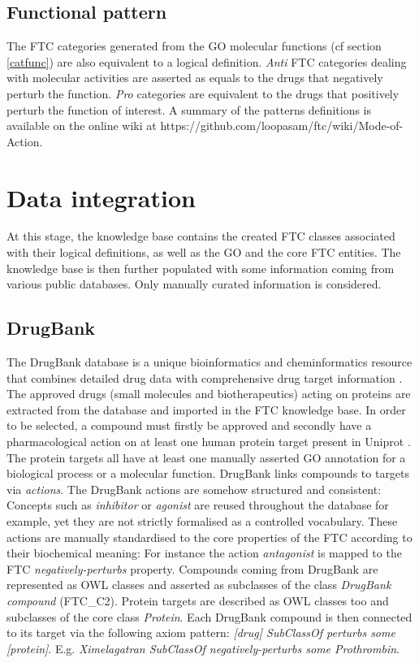 \documentclass{bioinfo}
\begin{document}
\subsection{Functional pattern}
The FTC categories generated from the GO molecular functions (cf section \ref{catfunc}) are also equivalent to a logical 
definition. \emph{Anti} FTC categories dealing with molecular activities are asserted as equals to the drugs 
that negatively perturb the function. \emph{Pro} categories are equivalent to the drugs that positively perturb the 
function of interest. A summary of the patterns definitions is available on the 
online wiki at {{https://github.com/loopasam/ftc/wiki/Mode-of-Action}}.

\section{Data integration}
At this stage, the knowledge base contains the created FTC classes associated with their 
logical definitions, as well as the GO and the core FTC entities. The knowledge base is then 
further populated with some information coming from various public databases. Only manually curated 
information is considered.

\subsection{DrugBank}
The DrugBank database is a unique bioinformatics and cheminformatics resource 
that combines detailed drug data with comprehensive drug target information \citep{Knox2011}. The approved 
drugs (small molecules and biotherapeutics) acting on proteins are extracted from the database and 
imported in the FTC knowledge base. In order to be selected, a compound must firstly be approved and 
secondly have a pharmacological action on at least one human protein target present in Uniprot \citep{TheUniprotConsortium2013}. 
The protein targets all have at least one manually asserted GO annotation \citep{Dimmer2012} for a biological process or a 
molecular function. DrugBank links compounds to targets via \emph{actions}. The DrugBank actions are somehow 
structured and consistent: Concepts such as \emph{inhibitor} or \emph{agonist} are reused throughout the database for 
example, yet they are not strictly formalised as a controlled vocabulary. These actions are manually 
standardised to the core properties of the FTC according to their biochemical meaning: For instance the action 
\emph{antagonist} is mapped to the FTC \emph{negatively-perturbs} property.
Compounds coming from DrugBank are represented as OWL classes and asserted 
as subclasses of the class \emph{DrugBank compound} (FTC\_C2). Protein targets are described as OWL classes 
too and subclasses of the core class \emph{Protein}. Each DrugBank compound is then connected to 
its target via the following axiom pattern: \emph{[drug] SubClassOf perturbs some [protein]}. 
E.g. \emph{Ximelagatran SubClassOf negatively-perturbs some Prothrombin}.
\end{document}
